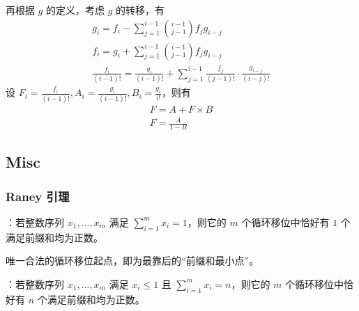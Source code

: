 再根据 $g$ 的定义，考虑 $g$ 的转移，有
\[
\begin{gathered}
g_i = f_i - \sum_{j = 1}^{i - 1} \binom{i - 1}{j - 1}f_jg_{i - j} \\
f_i = g_i + \sum_{j = 1}^{i - 1} \binom{i - 1}{j - 1}f_jg_{i - j} \\
\frac{f_i}{(i - 1)!} = \frac{g_i}{(i - 1)!} + \sum_{j = 1}^{i - 1}\frac{f_j}{(j - 1)!}\cdot \frac{g_{i - j}}{(i - j)!}
\end{gathered}
\]
设 $F_i = \frac{f_i}{(i - 1)!}, A_i = \frac{g_i}{(i - 1)!}, B_i = \frac{g_i}{i!}$，则有
\[
\begin{gathered}
F = A + F \times B \\
F = \frac{A}{1 - B}
\end{gathered}
\]

\subsection{Misc}

\subsubsection{Raney 引理}

：若整数序列 $x_1, \dots, x_m$ 满足 $\sum_{i = 1}^m x_i = 1$，则它的 $m$ 个循环移位中恰好有 $1$ 个满足前缀和均为正数。

唯一合法的循环移位起点，即为最靠后的“前缀和最小点”。

：若整数序列 $x_1, \dots, x_m$ 满足 $x_i \leq 1$ 且 $\sum_{i = 1}^m x_i = n$，则它的 $m$ 个循环移位中恰好有 $n$ 个满足前缀和均为正数。